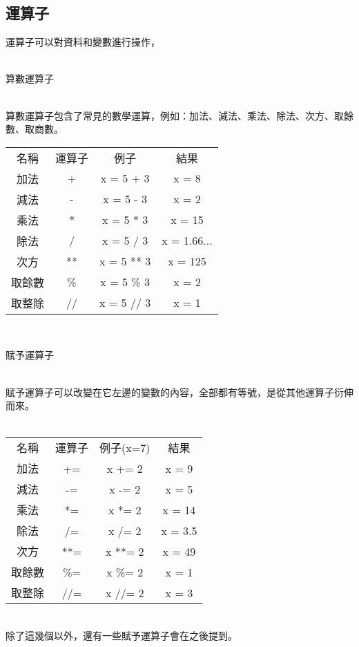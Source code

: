 \documentclass{article}
\begin{document}
\begin{large}
\section{運算子}
    運算子可以對資料和變數進行操作，\\
    \\
    \begin{LARGE}
    算數運算子\\
    \end{LARGE}
    \\
    算數運算子包含了常見的數學運算，例如：加法、減法、乘法、除法、次方、取餘數、取商數。\\
    \begin{tabular}{ |c|c|c|c| } 
        \hline
        名稱 & 運算子 & 例子 & 結果 \\
        加法 & + & x = 5 + 3 & x = 8 \\
        減法 & - & x = 5 - 3 & x = 2 \\
        乘法 & * & x = 5 * 3 & x = 15 \\
        除法 & / & x = 5 / 3 & x = 1.66... \\
        次方 & ** & x = 5 ** 3 & x = 125 \\
        取餘數& \% & x = 5 \% 3 & x = 2 \\
        取整除& // & x = 5 // 3 & x = 1 \\
        \hline
    \end{tabular}
    \\
    \begin{LARGE}
    賦予運算子\\
    \end{LARGE}
    \\
    賦予運算子可以改變在它左邊的變數的內容，全部都有等號，是從其他運算子衍伸而來。\\
    \\
    \begin{tabular}{ |c|c|c|c| } 
        \hline
        名稱 & 運算子 & 例子(x=7) & 結果 \\
        加法 & += & x += 2 & x = 9 \\
        減法 & -= & x -= 2 & x = 5 \\
        乘法 & *= & x *= 2 & x = 14 \\
        除法 & /= & x /= 2 & x = 3.5 \\
        次方 & **= & x **= 2 & x = 49 \\
        取餘數& \%= & x \%= 2 & x = 1 \\
        取整除& //= & x //= 2 & x = 3 \\
        \hline
    \end{tabular}
    \\
    除了這幾個以外，還有一些賦予運算子會在之後提到。



\end{large}
\end{document}
